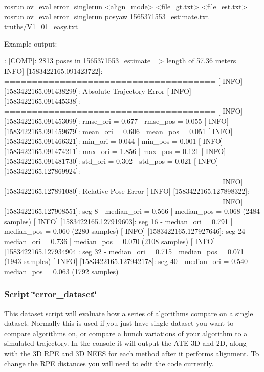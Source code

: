 \begin{DoxyCode}
rosrun ov\_eval error\_singlerun <align\_mode> <file\_gt.txt> <file\_est.txt>
rosrun ov\_eval error\_singlerun posyaw 1565371553\_estimate.txt truths/V1\_01\_easy.txt
\end{DoxyCode}


Example output\+:


\begin{DoxyCode}
[ INFO] [1583422165.069376426]: [COMP]: 2813 poses in 1565371553\_estimate => length of 57.36 meters
[ INFO] [1583422165.091423722]: ======================================
[ INFO] [1583422165.091438299]: Absolute Trajectory Error
[ INFO] [1583422165.091445338]: ======================================
[ INFO] [1583422165.091453099]: rmse\_ori = 0.677 | rmse\_pos = 0.055
[ INFO] [1583422165.091459679]: mean\_ori = 0.606 | mean\_pos = 0.051
[ INFO] [1583422165.091466321]: min\_ori  = 0.044 | min\_pos  = 0.001
[ INFO] [1583422165.091474211]: max\_ori  = 1.856 | max\_pos  = 0.121
[ INFO] [1583422165.091481730]: std\_ori  = 0.302 | std\_pos  = 0.021
[ INFO] [1583422165.127869924]: ======================================
[ INFO] [1583422165.127891080]: Relative Pose Error
[ INFO] [1583422165.127898322]: ======================================
[ INFO] [1583422165.127908551]: seg 8 - median\_ori = 0.566 | median\_pos = 0.068 (2484 samples)
[ INFO] [1583422165.127919603]: seg 16 - median\_ori = 0.791 | median\_pos = 0.060 (2280 samples)
[ INFO] [1583422165.127927646]: seg 24 - median\_ori = 0.736 | median\_pos = 0.070 (2108 samples)
[ INFO] [1583422165.127934904]: seg 32 - median\_ori = 0.715 | median\_pos = 0.071 (1943 samples)
[ INFO] [1583422165.127942178]: seg 40 - median\_ori = 0.540 | median\_pos = 0.063 (1792 samples)
\end{DoxyCode}


\hypertarget{eval-error_eval-ov-plot-dataset}{}\subsubsection{Script \char`\"{}error\+\_\+dataset\char`\"{}}\label{eval-error_eval-ov-plot-dataset}
This dataset script will evaluate how a series of algorithms compare on a single dataset. Normally this is used if you just have single dataset you want to compare algorithms on, or compare a bunch variations of your algorithm to a simulated trajectory. In the console it will output the A\+TE 3D and 2D, along with the 3D R\+PE and 3D N\+E\+ES for each method after it performs alignment. To change the R\+PE distances you will need to edit the code currently.


